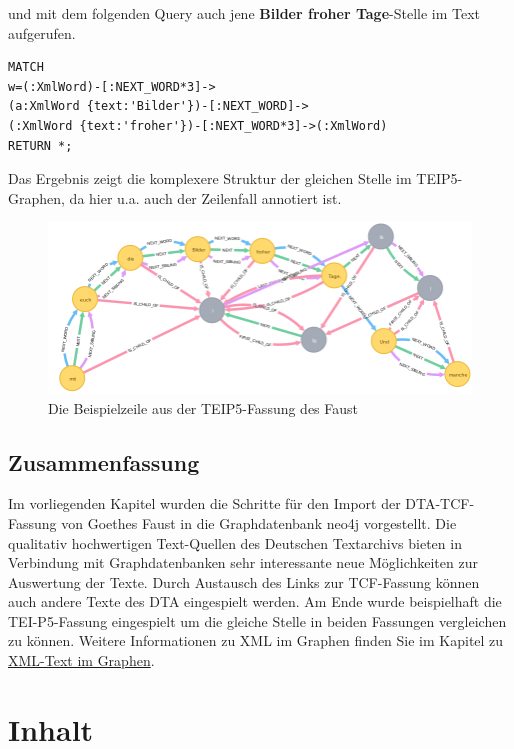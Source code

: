\documentclass[ngerman,]{scrreprt}
\begin{document}
und mit dem folgenden Query auch jene \textbf{Bilder froher Tage}-Stelle im Text aufgerufen.

\begin{verbatim}
MATCH
w=(:XmlWord)-[:NEXT_WORD*3]->
(a:XmlWord {text:'Bilder'})-[:NEXT_WORD]->
(:XmlWord {text:'froher'})-[:NEXT_WORD*3]->(:XmlWord)
RETURN *;
\end{verbatim}

Das Ergebnis zeigt die komplexere Struktur der gleichen Stelle im TEIP5-Graphen, da hier u.a. auch der Zeilenfall annotiert ist.

\begin{figure}
\centering
\includegraphics{Bilder/TEI2Graph/BilderFroherTageP5.png}
\caption{Die Beispielzeile aus der TEIP5-Fassung des Faust}
\end{figure}

\section{Zusammenfassung}\label{zusammenfassung-3}

Im vorliegenden Kapitel wurden die Schritte für den Import der DTA-TCF-Fassung von Goethes Faust in die Graphdatenbank neo4j vorgestellt. Die qualitativ hochwertigen Text-Quellen des Deutschen Textarchivs bieten in Verbindung mit Graphdatenbanken sehr interessante neue Möglichkeiten zur Auswertung der Texte. Durch Austausch des Links zur TCF-Fassung können auch andere Texte des DTA eingespielt werden. Am Ende wurde beispielhaft die TEI-P5-Fassung eingespielt um die gleiche Stelle in beiden Fassungen vergleichen zu können. Weitere Informationen zu XML im Graphen finden Sie im Kapitel zu \href{https://kuczera.github.io/Graphentechnologien/60_XML-Text-im-Graphen.html}{XML-Text im Graphen}.

\chapter{Inhalt}\label{inhalt-6}
\end{document}
